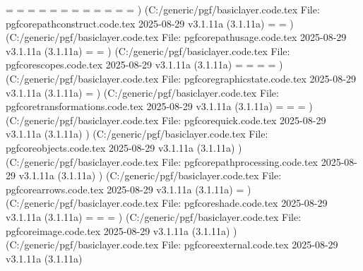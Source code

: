 \pgf@picminy=
\pgf@picmaxy=
\pgf@pathminx=
\pgf@pathmaxx=
\pgf@pathminy=
\pgf@pathmaxy=
\pgf@xx=
\pgf@xy=
\pgf@yx=
\pgf@yy=
\pgf@zx=
\pgf@zy=
) (C:\Users\SEARS\AppData\Local\Programs\MiKTeX\tex/generic/pgf/basiclayer\pgfcorepathconstruct.code.tex
File: pgfcorepathconstruct.code.tex 2025-08-29 v3.1.11a (3.1.11a)
\pgf@path@lastx=
\pgf@path@lasty=
) (C:\Users\SEARS\AppData\Local\Programs\MiKTeX\tex/generic/pgf/basiclayer\pgfcorepathusage.code.tex
File: pgfcorepathusage.code.tex 2025-08-29 v3.1.11a (3.1.11a)
\pgf@shorten@end@additional=
\pgf@shorten@start@additional=
) (C:\Users\SEARS\AppData\Local\Programs\MiKTeX\tex/generic/pgf/basiclayer\pgfcorescopes.code.tex
File: pgfcorescopes.code.tex 2025-08-29 v3.1.11a (3.1.11a)
\pgfpic=
\pgf@hbox=
\pgf@layerbox@main=
\pgf@picture@serial@count=
) (C:\Users\SEARS\AppData\Local\Programs\MiKTeX\tex/generic/pgf/basiclayer\pgfcoregraphicstate.code.tex
File: pgfcoregraphicstate.code.tex 2025-08-29 v3.1.11a (3.1.11a)
\pgflinewidth=
) (C:\Users\SEARS\AppData\Local\Programs\MiKTeX\tex/generic/pgf/basiclayer\pgfcoretransformations.code.tex
File: pgfcoretransformations.code.tex 2025-08-29 v3.1.11a (3.1.11a)
\pgf@pt@x=
\pgf@pt@y=
\pgf@pt@temp=
) (C:\Users\SEARS\AppData\Local\Programs\MiKTeX\tex/generic/pgf/basiclayer\pgfcorequick.code.tex
File: pgfcorequick.code.tex 2025-08-29 v3.1.11a (3.1.11a)
) (C:\Users\SEARS\AppData\Local\Programs\MiKTeX\tex/generic/pgf/basiclayer\pgfcoreobjects.code.tex
File: pgfcoreobjects.code.tex 2025-08-29 v3.1.11a (3.1.11a)
) (C:\Users\SEARS\AppData\Local\Programs\MiKTeX\tex/generic/pgf/basiclayer\pgfcorepathprocessing.code.tex
File: pgfcorepathprocessing.code.tex 2025-08-29 v3.1.11a (3.1.11a)
) (C:\Users\SEARS\AppData\Local\Programs\MiKTeX\tex/generic/pgf/basiclayer\pgfcorearrows.code.tex
File: pgfcorearrows.code.tex 2025-08-29 v3.1.11a (3.1.11a)
\pgfarrowsep=
) (C:\Users\SEARS\AppData\Local\Programs\MiKTeX\tex/generic/pgf/basiclayer\pgfcoreshade.code.tex
File: pgfcoreshade.code.tex 2025-08-29 v3.1.11a (3.1.11a)
\pgf@max=
\pgf@sys@shading@range@num=
\pgf@shadingcount=
) (C:\Users\SEARS\AppData\Local\Programs\MiKTeX\tex/generic/pgf/basiclayer\pgfcoreimage.code.tex
File: pgfcoreimage.code.tex 2025-08-29 v3.1.11a (3.1.11a)
) (C:\Users\SEARS\AppData\Local\Programs\MiKTeX\tex/generic/pgf/basiclayer\pgfcoreexternal.code.tex
File: pgfcoreexternal.code.tex 2025-08-29 v3.1.11a (3.1.11a)
